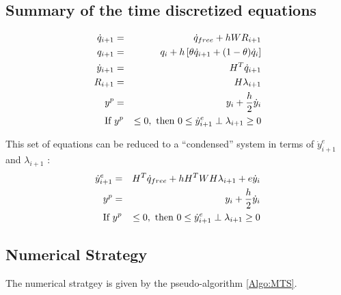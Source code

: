 \documentclass[10pt]{article}
\begin{document}
\subsection{Summary of the time discretized equations}
\begin{eqnarray}
  \dot q_{i+1} &=& \dot q_{free}  + h W R_{i+1} \\
  q_{i+1} &=& q_{i} +  h\left[\theta  \dot q_{i+1}+(1-\theta)  \dot q_{i}  \right] \\
  \dot y_{i+1} &=& H^{T}\dot q_{i+1} \\
  R_{i+1} &=& H \lambda_{i+1}\\
  y^{p} &=& y_{i} + \displaystyle \frac{h}{2}  \dot y_i\\
  \text{If }&y^{p}& \leq 0, \text{ then } 0 \leq \dot y^{e}_{i+1} \perp  \lambda_{i+1}  \geq 0
\end{eqnarray}

This set of equations can be reduced to a ``condensed'' system in terms of $\dot y^{e}_{i+1}$ and ${\lambda_{i+1}}$ :
\begin{eqnarray}
  \dot y^{e}_{i+1} &=&  H^{T} \dot q_{free} + h H^{T} W H \lambda_{i+1}  + e \dot y_{i}\\
  y^{p} &=& y_{i} + \displaystyle \frac{h}{2}  \dot y_i\\
  \text{If }&y^{p}& \leq 0, \text{ then } 0 \leq \dot y^{e}_{i+1} \perp  \lambda_{i+1}  \geq 0
\end{eqnarray}



\subsection{Numerical Strategy}

The numerical stratgey is given by the pseudo-algorithm \ref{Algo:MTS}.
\end{document}

